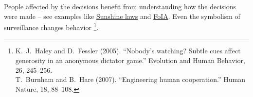 People affected by the decisions benefit from understanding how the decisions were made -- see examples like 
\href{https://en.wikipedia.org/wiki/Government_in_the_Sunshine_Act}{Sunshine laws} and
\href{https://en.wikipedia.org/wiki/Freedom_of_Information_Act_(United_States)}{FoIA}. 
Even the symbolism of surveillance changes behavior
\footnote{K.~J.~Haley and D.~Fessler (2005). ``Nobody’s watching? Subtle cues affect generosity in an anonymous dictator game.'' Evolution and Human Behavior, 26, 245–256.\\
T.~Burnham and B.~Hare (2007). ``Engineering human cooperation.'' Human Nature, 18, 88–108.}.



